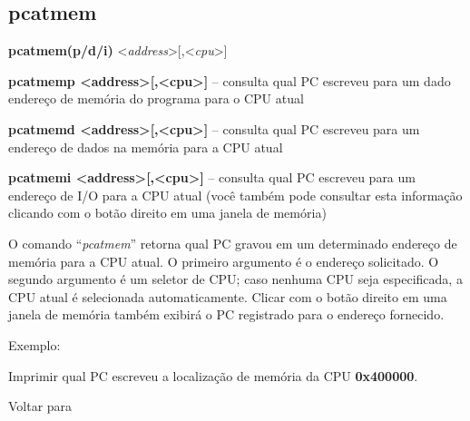 \documentclass[letterpaper,10pt,brazil]{sphinxmanual}
\begin{document}
\subsection{pcatmem}
\label{debugger/general:pcatmem}\label{debugger/general:debugger-command-pcatmem}
\begin{DUlineblock}{0em}
\item[]
\begin{DUlineblock}{\DUlineblockindent}
\item[] \textbf{pcatmem(p/d/i)} \textless{}\emph{address}\textgreater{}{[},\textless{}\emph{cpu}\textgreater{}{]}
\item[] 
\end{DUlineblock}
\item[] \textbf{pcatmemp \textless{}address\textgreater{}{[},\textless{}cpu\textgreater{}{]}} -- consulta qual PC escreveu para um dado endereço de memória do programa para o CPU atual
\item[] \textbf{pcatmemd \textless{}address\textgreater{}{[},\textless{}cpu\textgreater{}{]}} -- consulta qual PC escreveu para um endereço de dados na memória para a CPU atual
\item[] \textbf{pcatmemi \textless{}address\textgreater{}{[},\textless{}cpu\textgreater{}{]}} -- consulta qual PC escreveu para um endereço de I/O para a CPU atual (você também pode consultar esta informação clicando com o botão direito em uma janela de memória)
\item[] 
\item[] O comando ``\emph{pcatmem}'' retorna qual PC gravou em um determinado endereço de memória para a CPU atual. O primeiro argumento é o endereço solicitado. O segundo argumento é um seletor de CPU; caso nenhuma CPU seja especificada, a CPU atual é selecionada automaticamente. Clicar com o botão direito em uma janela de memória também exibirá o PC registrado para o endereço fornecido.
\item[] 
\item[] Exemplo:
\item[] 
\item[]
\begin{DUlineblock}{\DUlineblockindent}
\item[] 
\item[] 
\end{DUlineblock}
\item[] Imprimir qual PC escreveu a localização de memória da CPU \textbf{0x400000}.
\item[] 
\item[] Voltar para {\hyperref[debugger/general:debugger\string-general\string-list]{}}
\end{DUlineblock}
\begin{quote}
\label{debugger/general:debugger-command-rewind}\end{quote}
\end{document}
